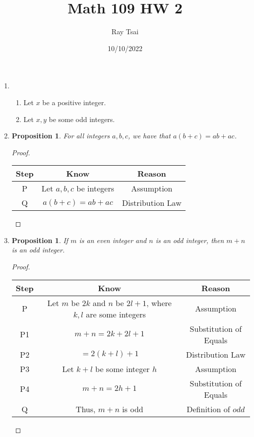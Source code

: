 \documentclass{article}
\title{Math 109 HW 2}
\author{Ray Tsai}
\date{10/10/2022}
\newtheorem{prop}[thm]{Proposition}
\begin{document}
 

\maketitle 

\begin{enumerate}
\item 
\begin{enumerate}
    \item
    Let $x$ be a positive integer.
    \item
    Let $x, y$ be some odd integers.
\end{enumerate}

\item \begin{prop}
    For all integers $a, b, c$, we have that $a(b+c) = ab+ac$.
    \end{prop}
    \begin{proof} \
    \begin{center}
    \begin{tabular}{|c|c|c|}
    \hline
    Step & Know & Reason \\ \hline
    P & Let $a, b, c$ be integers & Assumption \\ \hline
    Q & $a(b + c) = ab + ac$ & Distribution Law \\ \hline
\end{tabular}
\end{center}
\end{proof}

\item \begin{prop}
    If $m$ is an even integer and $n$ is an odd integer, then $m + n$ is an odd integer.
    \end{prop}
    \begin{proof} \
    \begin{center}
    \begin{tabular}{|c|c|c|}
    \hline
    Step & Know & Reason \\ \hline
    P & Let $m$ be $2k$ and $n$ be $2l + 1$, where $k, l$ are some integers & Assumption \\ \hline
    P1 & $m + n = 2k + 2l + 1$ & Substitution of Equals \\ \hline
    P2 & $= 2(k + l) + 1$ & Distribution Law \\ \hline
    P3 & Let $k + l$ be some integer $h$ & Assumption \\ \hline
    P4 & $m + n = 2h + 1$ & Substitution of Equals \\ \hline
    Q & Thus, $m + n$ is odd & Definition of $odd$ \\ \hline 
\end{tabular}
\end{center}
\end{proof} 


\end{enumerate}
\end{document}
